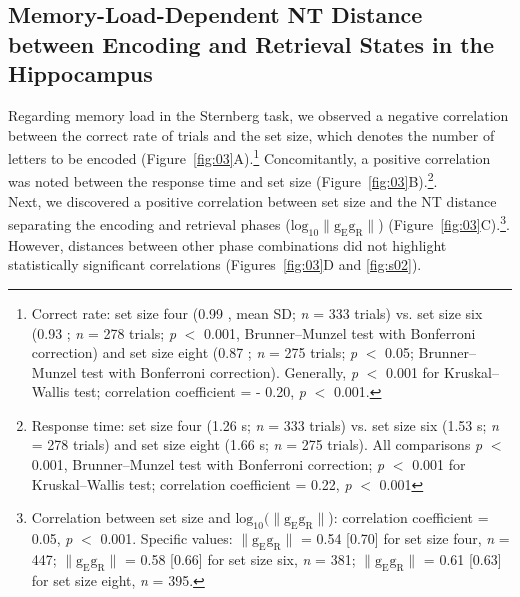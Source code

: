\documentclass[preprint,review,12pt]{elsarticle}%
\begin{document}
\subsection{Memory-Load-Dependent NT Distance between Encoding and Retrieval States in the Hippocampus}
Regarding memory load in the Sternberg task, we observed a negative correlation between the correct rate of trials and the set size, which denotes the number of letters to be encoded (Figure~\ref{fig:03}A).\footnote{Correct rate: set size four (0.99 , mean \textpm SD; \textit{n} = 333 trials) vs. set size six (0.93 ; \textit{n} = 278 trials; \textit{p} $<$ 0.001, Brunner--Munzel test with Bonferroni correction) and set size eight (0.87 ; \textit{n} = 275 trials; \textit{p} $<$ 0.05; Brunner--Munzel test with Bonferroni correction). Generally, \textit{p} $<$ 0.001 for Kruskal--Wallis test; correlation coefficient = - 0.20, \textit{p} $<$ 0.001.} Concomitantly, a positive correlation was noted between the response time and set size (Figure~\ref{fig:03}B).\footnote{Response time: set size four (1.26  s; \textit{n} = 333 trials) vs. set size six (1.53  s; \textit{n} = 278 trials) and set size eight (1.66  s; \textit{n} = 275 trials). All comparisons \textit{p} $<$ 0.001, Brunner--Munzel test with Bonferroni correction; \textit{p} $<$ 0.001 for Kruskal--Wallis test; correlation coefficient = 0.22, \textit{p} $<$ 0.001}.
\\
\indent
Next, we discovered a positive correlation between set size and the NT distance separating the encoding and retrieval phases ($\mathrm{log_{10}\lVert g_{E}g_{R} \rVert}$) (Figure~\ref{fig:03}C).\footnote{Correlation between set size and $\mathrm{log_{10}(\lVert g_{E}g_{R} \rVert}$): correlation coefficient = 0.05, \textit{p} $<$ 0.001. Specific values: $\mathrm{\lVert g_{E}g_{R} \rVert}$ = 0.54 [0.70] for set size four, \textit{n} = 447; $\mathrm{\lVert g_{E}g_{R} \rVert}$ = 0.58 [0.66] for set size six, \textit{n} = 381; $\mathrm{\lVert g_{E}g_{R} \rVert}$ = 0.61 [0.63] for set size eight, \textit{n} = 395.}. However, distances between other phase combinations did not highlight statistically significant correlations (Figures~\ref{fig:03}D and \ref{fig:s02}).
\end{document}
